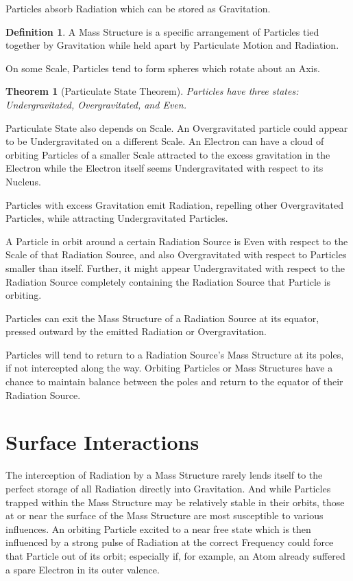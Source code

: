 \documentclass[12pt]{article}
\theoremstyle{plain}
\newtheorem{theorem}{Theorem}
\theoremstyle{definition}
\newtheorem{definition}{Definition}
\begin{document}
Particles absorb Radiation which can be stored as Gravitation.

\begin{definition}
A Mass Structure is a specific arrangement of Particles tied together by Gravitation while held apart by Particulate Motion and Radiation.
\end{definition}

On some Scale, Particles tend to form spheres which rotate about an Axis.

\begin{theorem}[Particulate State Theorem]
Particles have three states: Undergravitated, Overgravitated, and Even.
\end{theorem}

Particulate State also depends on Scale. An Overgravitated particle could appear to be Undergravitated on a different Scale. An Electron can have a cloud of orbiting Particles of a smaller Scale attracted to the excess gravitation in the Electron while the Electron itself seems Undergravitated with respect to its Nucleus.

Particles with excess Gravitation emit Radiation, repelling other Overgravitated Particles, while attracting Undergravitated Particles.

A Particle in orbit around a certain Radiation Source is Even with respect to the Scale of that Radiation Source, and also Overgravitated with respect to Particles smaller than itself. Further, it might appear Undergravitated with respect to the Radiation Source completely containing the Radiation Source that Particle is orbiting.

Particles can exit the Mass Structure of a Radiation Source at its equator, pressed outward by the emitted Radiation or Overgravitation.

Particles will tend to return to a Radiation Source's Mass Structure at its poles, if not intercepted along the way. Orbiting Particles or Mass Structures have a chance to maintain balance between the poles and return to the equator of their Radiation Source.


\section*{Surface Interactions}

The interception of Radiation by a Mass Structure rarely lends itself to the perfect storage of all Radiation directly into Gravitation. And while Particles trapped within the Mass Structure may be relatively stable in their orbits, those at or near the surface of the Mass Structure are most susceptible to various influences. An orbiting Particle excited to a near free state which is then influenced by a strong pulse of Radiation at the correct Frequency could force that Particle out of its orbit; especially if, for example, an Atom already suffered a spare Electron in its outer valence.
\end{document}
